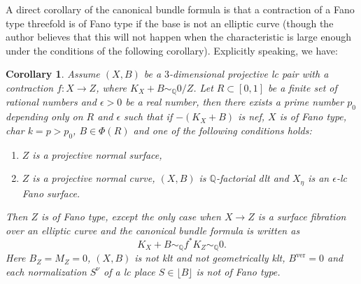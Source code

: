 \documentclass[letterpaper,reqno,12pt]{amsart}
\numberwithin{equation}{section}
\theoremstyle{plain}
\newtheorem{corollary}[theorem]{Corollary}
\begin{document}
A direct corollary of the canonical bundle formula is that a contraction of a Fano type threefold is of Fano type if the base is not an elliptic curve (though the author believes  that this will not happen when the characteristic is large enough under the conditions of the following corollary). Explicitly speaking, we have:
\begin{corollary}
\label{contr}
       Assume $(X,B)$ be a $3$-dimensional projective lc pair with a contraction $f:X\to Z$, where $K_X+B\sim_{{\mathbb Q}}0/Z$. Let $R\subset [0,1]$ be a finite set of rational numbers and $\epsilon>0$ be a real number, then there exists a prime number $p_0$ depending only on $R$ and $\epsilon$ such that if $-(K_X+B)$ is nef, $X$ is of Fano type, char $k=p>p_0$, $B\in\Phi(R)$ and one of the following conditions holds:
    \begin{enumerate}
        \item $Z$ is a projective normal surface,
        \item $Z$ is a projective normal curve, $(X,B)$ is $\mathbb Q$-factorial dlt and $X_\eta$ is an $\epsilon$-lc Fano surface.
    \end{enumerate}
    Then $Z$ is of Fano type, except the only case when $X\to Z$ is a surface fibration over an elliptic curve and the canonical bundle formula is written as
    \[K_X+B\sim_\mathbb Qf^*K_Z\sim_\mathbb Q0.\]
    Here $B_Z=M_Z=0$, $(X,B)$ is not klt and not geometrically klt, $B^\text{ver}=0$ and each normalization $S^\nu$ of a lc place $S\in\lfloor B\rfloor$ is not of Fano type.
\end{corollary}
\end{document}
